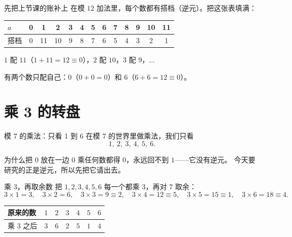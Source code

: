 \documentclass[10pt]{beamer}
\begin{document}
\begin{frame}{先把上节课的账补上}
  在模 \(12\) 加法里，每个数都有搭档（逆元）。把这张表填满：
  \pause
  \begin{center}
  \begin{tabular}{@{}l*{12}{c}@{}}
    \toprule
    \(a\) & 0 & 1 & 2 & 3 & 4 & 5 & 6 & 7 & 8 & 9 & 10 & 11 \\
    \midrule
    \(\text{搭档}\) & 0 & 11 & 10 & 9 & 8 & 7 & 6 & 5 & 4 & 3 & 2 & 1 \\
    \bottomrule
  \end{tabular}
  \end{center}
  \pause
  \(1\) 配 \(11\)（\(1+11=12\equiv 0\)），\(2\) 配 \(10\)，\(3\) 配 \(9\)，\(\dots\)
  \pause
  \begin{att}
    有两个数只配自己：\textbf{\(0\)}（\(0+0=0\)）和 \textbf{\(6\)}（\(6+6=12\equiv 0\)）。
  \end{att}
\end{frame}

\section{乘 3 的转盘}

\begin{frame}{模 7 的乘法：只看 1 到 6}
  在模 \(7\) 的世界里做乘法，我们只看
  \[
    1,\ 2,\ 3,\ 4,\ 5,\ 6 .
  \]
  \pause
  \begin{block}{为什么把 0 放在一边}
    \(0\) 乘任何数都得 \(0\)，永远回不到 \(1\)——它没有逆元。
    今天要研究的正是逆元，所以先把它请出去。
  \end{block}
\end{frame}

\begin{frame}{乘 3，再取余数}
  把 \(1,2,3,4,5,6\) 每一个都乘 \(3\)，再对 \(7\) 取余：
  \[
    3\times1=3,\quad 3\times2=6,\quad 3\times3=9\equiv2,\quad
    3\times4=12\equiv5,\quad 3\times5=15\equiv1,\quad 3\times6=18\equiv4 .
  \]
  \pause
  \begin{center}
  \begin{tabular}{@{}lcccccc@{}}
    \toprule
    原来的数 & \(1\) & \(2\) & \(3\) & \(4\) & \(5\) & \(6\) \\
    \midrule
    乘 \(3\) 之后 & \(3\) & \(6\) & \(2\) & \(5\) & \(1\) & \(4\) \\
    \bottomrule
  \end{tabular}
  \end{center}
\end{frame}
\end{document}
